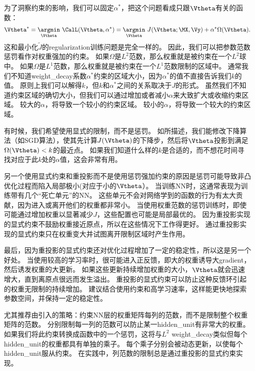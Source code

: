 为了洞察约束的影响，我们可以固定$\alpha^*$，把这个问题看成只跟$\Vtheta$有关的函数：
\begin{align}
 \Vtheta^* =  \underset{\Vtheta}{ \argmin} ~\CalL(\Vtheta, \alpha^*) = 
 \underset{\Vtheta}{ \argmin}~
 J(\Vtheta; \MX, \Vy) + \alpha^* \Omega(\Vtheta).
\end{align}
这和最小化$\tilde J$的\gls{regularization}训练问题是完全一样的。
因此，我们可以把参数范数惩罚看作对权重强加的约束。
如果$\Omega$是$L^2$范数，那么权重就是被约束在一个$L^2$球中。
如果$\Omega$是$L^1$范数，那么权重就是被约束在一个$L^1$范数限制的区域中。
通常我们不知道\gls{weight_decay}系数$\alpha^*$约束的区域大小，因为$\alpha^*$的值不直接告诉我们$k$的值。
原则上我们可以解得$k$，但$k$和$\alpha^*$之间的关系取决于$J$的形式。
虽然我们不知道约束区域的确切大小，但我们可以通过增加或者减小$\alpha$来大致扩大或收缩约束区域。
较大的$\alpha$，将导致一个较小的约束区域。
较小的$\alpha$，将导致一个较大的约束区域。


有时候，我们希望使用显式的限制，而不是惩罚。
如所描述，我们能修改下降算法（如\gls{SGD}算法），使其先计算$J(\Vtheta)$的下降步，然后将$\Vtheta$投影到满足$\Omega(\Vtheta) < k$的最近点。
如果我们知道什么样的$k$是合适的，而不想花时间寻找对应于此$k$处的$\alpha$值，这会非常有用。

另一个使用显式约束和重投影而不是使用惩罚强加约束的原因是惩罚可能导致非凸优化过程而陷入局部极小(对应于小的$\Vtheta$）。
当训练\gls{NN}时，这通常表现为训练带有几个``死亡单元''的\gls{NN}。
这些单元不会对网络学到的函数的行为有太大贡献，因为进入或离开他们的权重都非常小。
当使用权重范数的惩罚训练时，即使可能通过增加权重以显著减少$J$，这些配置也可能是局部最优的。
因为重投影实现的显式约束不鼓励权重接近原点，所以在这些情况下工作得更好。
通过重投影实现的显式约束只在权重变大并试图离开限制区域时产生作用。

最后，因为重投影的显式约束还对优化过程增加了一定的稳定性，所以这是另一个好处。
当使用较高的学习率时，很可能进入正反馈，即大的权重诱导大\gls{gradient}，然后诱发权重的大更新。
如果这些更新持续增加权重的大小，$\Vtheta$就会迅速增大，直到离原点很远而发生溢出。
重投影的显式约束可以防止这种反馈环引起的权重无限制的持续增加。
\cite{Hinton-et-al-arxiv2012}建议结合使用约束和高学习速率，这样能更快地探索参数空间，并保持一定的稳定性。


\cite{Hinton-et-al-arxiv2012}尤其推荐由\cite{Srebro05}引入的策略：约束\gls{NN}层的权重矩阵每列的范数，而不是限制整个权重矩阵的范数。
分别限制每一列的范数可以防止某一\gls{hidden_unit}有非常大的权重。
如果我们将此约束转换成函数中的一个惩罚，这将与$L^2$ \gls{weight_decay}类似但每个\gls{hidden_unit}的权重都具有单独的乘子。
每个乘子分别会被动态更新，以使每个\gls{hidden_unit}服从约束。
在实践中，列范数的限制总是通过重投影的显式约束实现。

